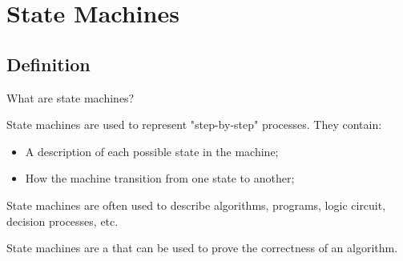 \section{State Machines}


\subsection{Definition}

\begin{frame}{What are state machines?}

  State machines are used to represent "step-by-step" processes. They contain:
  \begin{itemize}
    \item A description of each possible state in the machine;
    \item How the machine transition from one state to another;
  \end{itemize}\bigskip

  State machines are often used to describe algorithms, programs, logic circuit, decision processes, etc.\bigskip

  State machines are a  that can be used to prove the correctness of an algorithm.
\end{frame}

